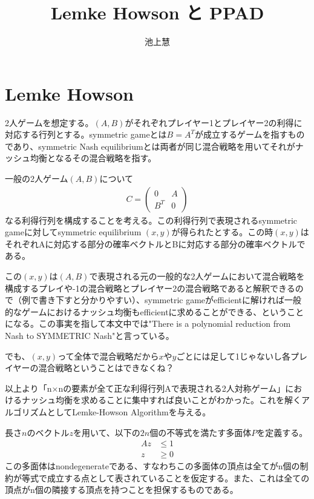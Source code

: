 \documentclass{jsarticle}
\begin{document}
\title{Lemke Howson と PPAD}
\author{池上慧}
\maketitle

\section{Lemke Howson}
2人ゲームを想定する。$(A, B)$がそれぞれプレイヤー1とプレイヤー2の利得に対応する行列とする。symmetric gameとは$B = A^T$が成立するゲームを指すものであり、symmetric Nash equilibriumとは両者が同じ混合戦略を用いてそれがナッシュ均衡となるその混合戦略を指す。

一般の2人ゲーム$(A,B)$について
\begin{align}
	C = \begin{pmatrix}
			0 & A \\
			B^T & 0 
		\end{pmatrix}
\end{align}
なる利得行列を構成することを考える。この利得行列で表現されるsymmetric gameに対してsymmetric equilibrium $(x, y)$が得られたとする。この時$(x, y)$はそれぞれAに対応する部分の確率ベクトルとBに対応する部分の確率ベクトルである。

この$(x, y)$は$(A, B)$で表現される元の一般的な2人ゲームにおいて混合戦略を構成するプレイや-1の混合戦略とプレイヤー2の混合戦略であると解釈できるので（例で書き下すと分かりやすい）、symmetric gameがefficientに解ければ一般的なゲームにおけるナッシュ均衡もefficientに求めることができる、ということになる。この事実を指して本文中では"There is a polynomial reduction from Nash to SYMMETRIC Nash"と言っている。

でも、$(x, y)$って全体で混合戦略だから$x$や$y$ごとには足して1じゃないし各プレイヤーの混合戦略ということはできなくね？

以上より「n×nの要素が全て正な利得行列Aで表現される2人対称ゲーム」におけるナッシュ均衡を求めることに集中すれば良いことがわかった。これを解くアルゴリズムとしてLemke-Howson Algorithmを与える。

長さ$n$のベクトル$z$を用いて、以下の$2n$個の不等式を満たす多面体$P$を定義する。
\begin{align}
	Az &\leq 1\\
	z &\geq 0
\end{align}
この多面体はnondegenerateである、すなわちこの多面体の頂点は全てがn個の制約が等式で成立する点として表されていることを仮定する。また、これは全ての頂点がn個の隣接する頂点を持つことを担保するものである。
\end{document}
